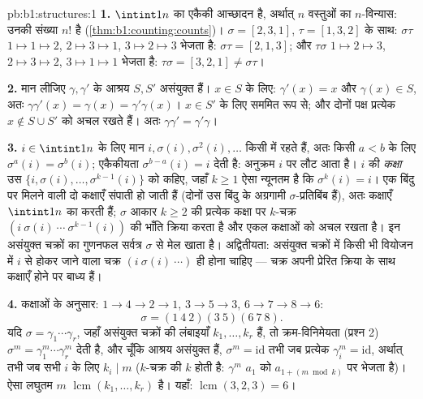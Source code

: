 \begin{solution}{pb:b1:structures:1}
\textbf{1.}  $\intint1n$ का एकैकी आच्छादन है, अर्थात् $n$ वस्तुओं का
$n$-विन्यास: उनकी संख्या $n!$ है (\cref{thm:b1:counting:counts})। $\sigma =
[2,3,1]$, $\tau = [1,3,2]$ के साथ: $\sigma\tau$ $1 \mapsto 1 \mapsto 2$, $2
\mapsto 3 \mapsto 1$, $3 \mapsto 2 \mapsto 3$ भेजता है: $\sigma\tau =
[2,1,3]$; और $\tau\sigma$ $1 \mapsto 2 \mapsto 3$, $2 \mapsto 3 \mapsto 2$,
$3 \mapsto 1 \mapsto 1$ भेजता है: $\tau\sigma = [3,2,1] \neq \sigma\tau$।

\textbf{2.} मान लीजिए $\gamma, \gamma'$ के आश्रय $S, S'$ असंयुक्त हैं। $x
\in S$ के लिए: $\gamma'(x) = x$ और $\gamma(x) \in S$, अतः $\gamma\gamma'(x)
= \gamma(x) = \gamma'\gamma(x)$। $x \in S'$ के लिए सममित रूप से; और दोनों
पक्ष प्रत्येक $x \notin S \cup S'$ को अचल रखते हैं। अतः $\gamma\gamma' =
\gamma'\gamma$।

\textbf{3.} $i \in \intint1n$ के लिए मान $i, \sigma(i), \sigma^2(i), \dots$
किसी  में रहते हैं, अतः किसी $a < b$ के लिए $\sigma^a(i) =
\sigma^b(i)$; एकैकीयता $\sigma^{b-a}(i) = i$ देती है: अनुक्रम $i$ पर लौट आता
है। $i$ की \emph{कक्षा} उस  $\{i, \sigma(i), \dots,
\sigma^{k-1}(i)\}$ को कहिए, जहाँ $k \geq 1$ ऐसा न्यूनतम है कि $\sigma^k(i) =
i$। एक बिंदु पर मिलने वाली दो कक्षाएँ संपाती हो जाती हैं (दोनों उस बिंदु के
अग्रगामी $\sigma$-प्रतिबिंब हैं), अतः कक्षाएँ $\intint1n$ का  करती
हैं; $\sigma$ आकार $k \geq 2$ की प्रत्येक कक्षा पर $k$-चक्र $(i\ \sigma(i)\
\cdots\ \sigma^{k-1}(i))$ की भाँति क्रिया करता है और एकल कक्षाओं को अचल रखता
है। इन असंयुक्त चक्रों का गुणनफल सर्वत्र $\sigma$ से मेल खाता है।
अद्वितीयता: असंयुक्त चक्रों में किसी भी वियोजन में $i$ से होकर जाने वाला
चक्र $(i\ \sigma(i)\ \cdots)$ ही होना चाहिए --- चक्र अपनी प्रेरित क्रिया के
साथ कक्षाएँ होने पर बाध्य हैं।

\textbf{4.} कक्षाओं के अनुसार: $1 \to 4 \to 2 \to 1$, $3 \to 5 \to 3$, $6
\to 7 \to 8 \to 6$:
\[
\sigma = (1\ 4\ 2)(3\ 5)(6\ 7\ 8) .
\]
यदि $\sigma = \gamma_1\cdots\gamma_r$, जहाँ असंयुक्त चक्रों की लंबाइयाँ
$k_1, \dots, k_r$ हैं, तो क्रम-विनिमेयता (प्रश्न 2) $\sigma^m =
\gamma_1^m\cdots\gamma_r^m$ देती है, और चूँकि आश्रय असंयुक्त हैं, $\sigma^m
= \mathrm{id}$ तभी जब प्रत्येक $\gamma_i^m = \mathrm{id}$, अर्थात् तभी जब
सभी $i$ के लिए $k_i \mid m$ ($k$-चक्र की  $k$ होती है: $\gamma^m$ $a_1$
को $a_{1 + (m \bmod k)}$ पर भेजता है)। ऐसा लघुतम $m$
$\operatorname{lcm}(k_1, \dots, k_r)$ है। यहाँ: $\operatorname{lcm}(3, 2, 3)
= 6$।


\end{solution}
